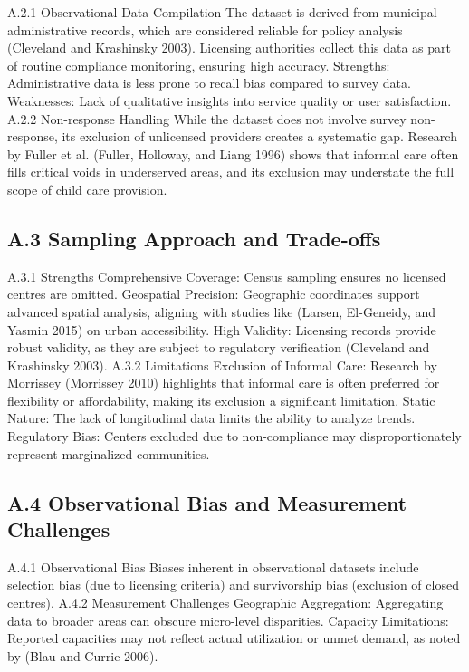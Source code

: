 \documentclass[
  letterpaper,
  DIV=11,
  numbers=noendperiod]{scrartcl}
\begin{document}
A.2.1 Observational Data Compilation The dataset is derived from
municipal administrative records, which are considered reliable for
policy analysis (Cleveland and Krashinsky 2003). Licensing authorities
collect this data as part of routine compliance monitoring, ensuring
high accuracy. Strengths: Administrative data is less prone to recall
bias compared to survey data. Weaknesses: Lack of qualitative insights
into service quality or user satisfaction. A.2.2 Non-response Handling
While the dataset does not involve survey non-response, its exclusion of
unlicensed providers creates a systematic gap. Research by Fuller et al.
(Fuller, Holloway, and Liang 1996) shows that informal care often fills
critical voids in underserved areas, and its exclusion may understate
the full scope of child care provision.

\subsection{A.3 Sampling Approach and
Trade-offs}\label{a.3-sampling-approach-and-trade-offs}

A.3.1 Strengths Comprehensive Coverage: Census sampling ensures no
licensed centres are omitted. Geospatial Precision: Geographic
coordinates support advanced spatial analysis, aligning with studies
like (Larsen, El-Geneidy, and Yasmin 2015) on urban accessibility. High
Validity: Licensing records provide robust validity, as they are subject
to regulatory verification (Cleveland and Krashinsky 2003). A.3.2
Limitations Exclusion of Informal Care: Research by Morrissey (Morrissey
2010) highlights that informal care is often preferred for flexibility
or affordability, making its exclusion a significant limitation. Static
Nature: The lack of longitudinal data limits the ability to analyze
trends. Regulatory Bias: Centers excluded due to non-compliance may
disproportionately represent marginalized communities.

\subsection{A.4 Observational Bias and Measurement
Challenges}\label{a.4-observational-bias-and-measurement-challenges}

A.4.1 Observational Bias Biases inherent in observational datasets
include selection bias (due to licensing criteria) and survivorship bias
(exclusion of closed centres). A.4.2 Measurement Challenges Geographic
Aggregation: Aggregating data to broader areas can obscure micro-level
disparities. Capacity Limitations: Reported capacities may not reflect
actual utilization or unmet demand, as noted by (Blau and Currie 2006).
\end{document}
